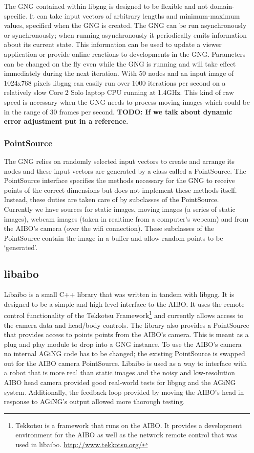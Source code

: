 \documentclass{article}
\renewcommand{\|}{\origbar} %
\begin{document}
The GNG contained within libgng is designed to be flexible and not domain-specific. It can take input vectors of arbitrary lengths and minimum-maximum values, specified when the GNG is created. The GNG can be run asynchronously or synchronously; when running asynchronously it periodically emits information about its current state. This information can be used to update a viewer application or provide online reactions to developments in the GNG. Parameters can be changed on the fly even while the GNG is running and will take effect immediately during the next iteration. With 50 nodes and an input image of 1024x768 pixels libgng can easily run over 1000 iterations per second on a relatively slow Core 2 Solo laptop CPU running at 1.4GHz. This kind of raw speed is necessary when the GNG needs to process moving images which could be in the range of 30 frames per second. {\bf TODO: If we talk about dynamic error adjustment put in a reference.}

\subsubsection{PointSource}

The GNG relies on randomly selected input vectors to create and arrange its nodes and these input vectors are generated by a class called a PointSource. The PointSource interface specifies the methods necessary for the GNG to receive points of the correct dimensions but does not implement these methods itself. Instead, these duties are taken care of by subclasses of the PointSource. Currently we have sources for static images, moving images (a series of static images), webcam images (taken in realtime from a computer's webcam) and from the AIBO's camera (over the wifi connection). These subclasses of the PointSource contain the image in a buffer and allow random points to be `generated'.

\subsection{libaibo}

Libaibo is a small C++ library that was written in tandem with libgng. It is designed to be a simple and high level interface to the AIBO. It uses the remote control functionality of the Tekkotsu Framework\footnote{Tekkotsu is a framework that runs on the AIBO. It provides a development environment for the AIBO as well as the network remote control that was used in libaibo. \url{http://www.tekkotsu.org/}} and currently allows access to the camera data and head/body controls. The library also provides a PointSource that provides access to points points from the AIBO's camera. This is meant as a plug and play module to drop into a GNG instance. To use the AIBO's camera no internal AGiNG code has to be changed; the existing PointSource is swapped out for the AIBO camera PointSource. Libaibo is used as a way to interface with a robot that is more real than static images and the noisy and low-resolution AIBO head camera provided good real-world tests for libgng and the AGiNG system. Additionally, the feedback loop provided by moving the AIBO's head in response to AGiNG's output allowed more thorough testing. 
\end{document}
